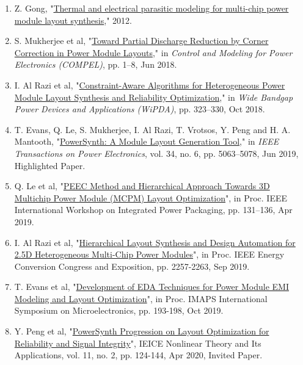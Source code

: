 \documentclass[11pt]{article}
\begin{document}
\begin{enumerate}
\item Z. Gong, "\href{./Publications/Gong_Zihao_thesis.pdf}{Thermal and electrical parasitic modeling for multi-chip power module layout synthesis}," 2012.



\item S. Mukherjee et al, "\href{./Publications/PID5441927.pdf}{Toward Partial Discharge Reduction by Corner Correction in Power Module Layouts}," in \emph{Control and Modeling for Power Electronics (COMPEL)},  pp. 1–8, Jun 2018.


\item I. Al Razi et al, "\href{./Publications/WIPDA_2018.pdf}{Constraint-Aware Algorithms for Heterogeneous Power Module Layout Synthesis and Reliability Optimization}," in \emph{ Wide Bandgap Power Devices and Applications (WiPDA)}, pp. 323–330, Oct 2018.

\item T. Evans, Q. Le, S. Mukherjee, I. Al Razi, T. Vrotsos, Y. Peng and H. A. Mantooth, "\href{./Publications/PowerSynth-A_Module_Layout_Generation_Tool.pdf}{PowerSynth: A Module Layout Generation Tool}," in \emph{IEEE Transactions on Power Electronics}, vol. 34, no. 6, pp. 5063–5078, Jun 2019, Highlighted Paper.


\item Q. Le et al, "\href{./Publications/Q.Le_IWIPP_19.pdf}{PEEC Method and Hierarchical Approach Towards 3D Multichip Power Module (MCPM) Layout Optimization}", in Proc. IEEE International Workshop on Integrated Power Packaging, pp. 131–136, Apr 2019.

\item 	I. Al Razi et al, "\href{./Publications/I.Al.Razi-ECCE_19.pdf} {Hierarchical Layout Synthesis and Design Automation for 2.5D Heterogeneous Multi-Chip Power Modules}", in Proc. IEEE Energy Conversion Congress and Exposition, pp. 2257-2263, Sep 2019.

\item T. Evans et al, "\href{./Publications/T.Evans_IMAPS_19.pdf}{Development of EDA Techniques for Power Module EMI Modeling and Layout Optimization}", in Proc. IMAPS International Symposium on Microelectronics, pp. 193-198, Oct 2019.

\item Y. Peng et al, "\href{./Publications/Y.Peng_NOLTA_20.pdf}{PowerSynth Progression on Layout Optimization for Reliability and Signal Integrity}", IEICE Nonlinear Theory and Its Applications, vol. 11, no. 2, pp. 124-144, Apr 2020, Invited Paper.


\end{enumerate}
\end{document}
